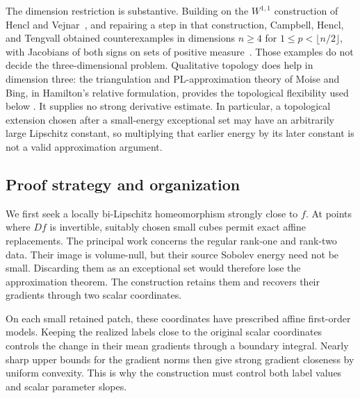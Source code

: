 The dimension restriction is substantive.  Building on the $W^{1,1}$
construction of Hencl and Vejnar~\cite{HenclVejnar2016}, and repairing
a step in that construction, Campbell, Hencl, and Tengvall obtained
counterexamples in dimensions $n\ge4$ for
$1\le p<\lfloor n/2\rfloor$, with Jacobians of both signs on sets
of positive measure~\cite{CampbellHenclTengvall2018}.  Those examples
do not decide the three-dimensional problem.  Qualitative topology
does help in dimension three: the triangulation and PL-approximation
theory of Moise and Bing, in Hamilton's relative formulation,
provides the topological flexibility used below
\cite{Moise1952Approximation,Moise1952Triangulation,Bing1959,Hamilton1976}.
It supplies no strong derivative estimate.  In particular, a
topological extension chosen after a small-energy exceptional set may
have an arbitrarily large Lipschitz constant, so multiplying that
earlier energy by its later constant is not a valid approximation
argument.

\subsection{Proof strategy and organization}

We first seek a locally bi-Lipschitz homeomorphism strongly close to
$f$.  At points where $Df$ is invertible, suitably chosen small
cubes permit exact affine replacements.  The principal work concerns
the regular rank-one and rank-two data.  Their image is volume-null,
but their source Sobolev energy need not be small.  Discarding them
as an exceptional set would therefore lose the approximation theorem.
The construction retains them and recovers their gradients through
two scalar coordinates.

On each small retained patch, these coordinates have prescribed affine
first-order models.  Keeping the realized labels close to the original
scalar coordinates controls the change in their mean gradients through
a boundary integral.  Nearly
sharp upper bounds for the gradient norms then give strong gradient
closeness by uniform convexity.  This is why the construction must
control both label values and scalar parameter slopes.

